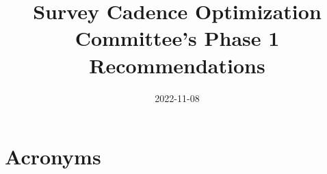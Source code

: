 \documentclass[modern]{aastex7}
\begin{document}

\date{2022-11-08}
\title{Survey Cadence Optimization Committee's Phase 1 Recommendations}





%



\section{Acronyms} \label{sec:acronyms}

\end{document}
